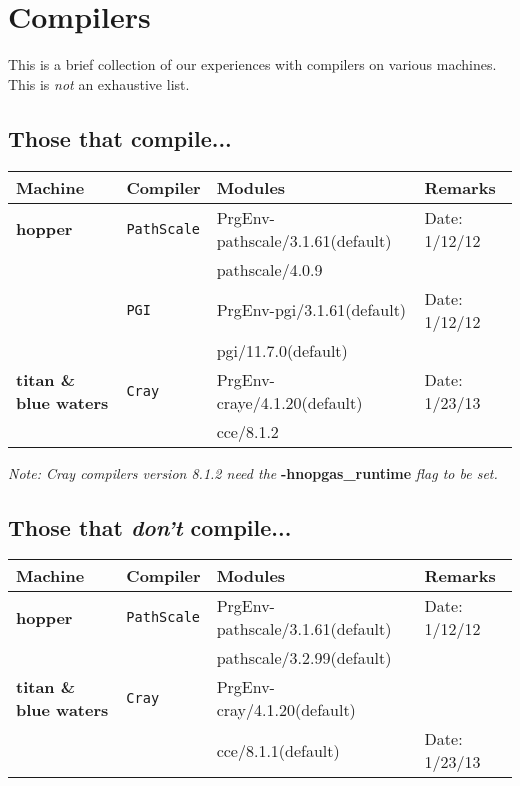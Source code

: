 \newpage
\section{Compilers}

This is a brief collection of our experiences with compilers on various machines.  This is {\em not} an exhaustive list.

\subsection{Those that compile...}

\begin{table*}[!h]
\begin{tabular}{|l|l|l|l|} \hline
Machine & Compiler & Modules & Remarks \\
\hline
{\bf hopper} & {\tt PathScale} & PrgEnv-pathscale/3.1.61(default) & Date: 1/12/12\\
& & pathscale/4.0.9 & \\
\cline{2-4}
& {\tt PGI} & PrgEnv-pgi/3.1.61(default) & Date: 1/12/12\\
& & pgi/11.7.0(default) & \\
\hline
{\bf titan \& blue waters} & {\tt Cray} & PrgEnv-craye/4.1.20(default) & Date: 1/23/13\\
& & cce/8.1.2 & \\
\hline
\end{tabular}
\label{Table:Those-that-compile}
\end{table*}
{\em Note: Cray compilers version 8.1.2 need the } {\bf -hnopgas\_runtime} {\em flag to be set.}

\subsection{Those that {\em don't} compile...}
\begin{table*}[!h]
\begin{tabular}{|l|l|l|l|} \hline
Machine & Compiler & Modules & Remarks \\
\hline
{\bf hopper} & {\tt PathScale} & PrgEnv-pathscale/3.1.61(default) & Date: 1/12/12\\
& & pathscale/3.2.99(default) & \\
\hline
{\bf titan \& blue waters} & {\tt Cray} & PrgEnv-cray/4.1.20(default) & \\
& & cce/8.1.1(default) & Date: 1/23/13\\
\hline
\end{tabular}
\label{Table:Those-that-dont-compile}
\end{table*}
